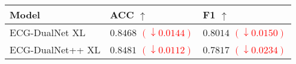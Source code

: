 \begin{tabular}{>{\raggedright\arraybackslash}p{}>{\raggedright\arraybackslash}p{}>{\raggedright\arraybackslash}p{}}
    \hline
	Model & ACC $\uparrow$ & F1 $\uparrow$ \\
	\hline
	ECG-DualNet XL & $0.8468$ \tiny{\textcolor{red}{$(\downarrow 0.0144)$}} & $0.8014$ \tiny{\textcolor{red}{$(\downarrow 0.0150)$}} \\
	ECG-DualNet++ XL & $0.8481$ \tiny{\textcolor{red}{$(\downarrow 0.0112)$}} & $0.7817$ \tiny{\textcolor{red}{$(\downarrow 0.0234)$}} \\
	\hline
\end{tabular}
